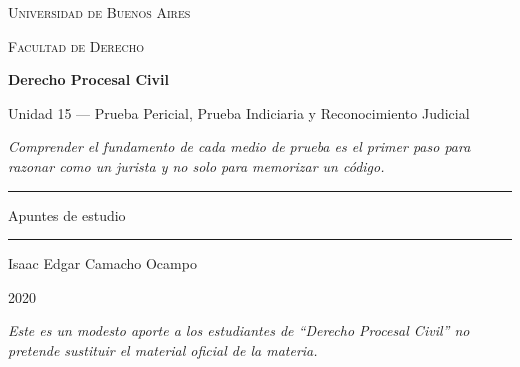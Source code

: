 \documentclass[12pt,oneside]{book}
\newcommand{\universidad}{Universidad de Buenos Aires}
\newcommand{\facultad}{Facultad de Derecho}
\newcommand{\materia}{Derecho Procesal Civil}
\newcommand{\titulo}{Unidad 15 --- Prueba Pericial, Prueba Indiciaria y Reconocimiento Judicial}
\newcommand{\autor}{Isaac Edgar Camacho Ocampo}
\newcommand{\anio}{2020}
\begin{document}
\begin{titlepage}

\thispagestyle{empty}

\begin{center}

\vspace*{1cm}

{\large \textsc{\universidad}}

\vspace{0.2cm}

{\large \textsc{\facultad}}

\vspace{3cm}

{\Huge \textbf{\materia}}

\vspace{1cm}

{\LARGE \titulo}

\vspace{0.8cm}

\textit{Comprender el fundamento de cada medio de prueba es el primer paso para razonar como un jurista y no solo para memorizar un código.}

\vspace{1.2cm}

\rule{0.70\textwidth}{0.5pt}

\vspace{0.5cm}

{\large Apuntes de estudio}

\vspace{0.5cm}

\rule{0.70\textwidth}{0.5pt}

\vfill

{\large \autor}

\vspace{0.3cm}

{\large \anio}

\end{center}

\vfill

\begin{flushleft}
\textit{Este es un modesto aporte a los estudiantes de ``Derecho Procesal Civil'' no pretende sustituir el material oficial de la materia.}
\end{flushleft}

\end{titlepage}

\tableofcontents
\end{document}
